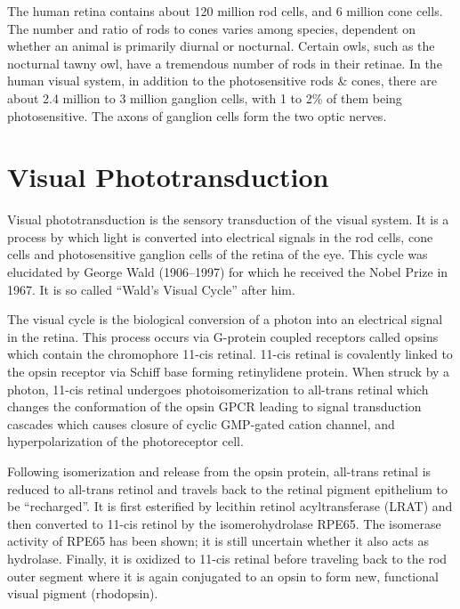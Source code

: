 \documentclass[]{book}
\begin{document}
The human retina contains about 120 million rod cells, and 6 million cone cells. The number and ratio of rods to cones varies among species, dependent on whether an animal is primarily diurnal or nocturnal. Certain owls, such as the nocturnal tawny owl, have a tremendous number of rods in their retinae. In the human visual system, in addition to the photosensitive rods \& cones, there are about 2.4 million to 3 million ganglion cells, with 1 to 2\% of them being photosensitive. The axons of ganglion cells form the two optic nerves.

\hypertarget{visual-phototransduction}{%
\section{Visual Phototransduction}\label{visual-phototransduction}}

Visual phototransduction is the sensory transduction of the visual system. It is a process by which light is converted into electrical signals in the rod cells, cone cells and photosensitive ganglion cells of the retina of the eye. This cycle was elucidated by George Wald (1906--1997) for which he received the Nobel Prize in 1967. It is so called ``Wald's Visual Cycle'' after him.

The visual cycle is the biological conversion of a photon into an electrical signal in the retina. This process occurs via G-protein coupled receptors called opsins which contain the chromophore 11-cis retinal. 11-cis retinal is covalently linked to the opsin receptor via Schiff base forming retinylidene protein. When struck by a photon, 11-cis retinal undergoes photoisomerization to all-trans retinal which changes the conformation of the opsin GPCR leading to signal transduction cascades which causes closure of cyclic GMP-gated cation channel, and hyperpolarization of the photoreceptor cell.

Following isomerization and release from the opsin protein, all-trans retinal is reduced to all-trans retinol and travels back to the retinal pigment epithelium to be ``recharged''. It is first esterified by lecithin retinol acyltransferase (LRAT) and then converted to 11-cis retinol by the isomerohydrolase RPE65. The isomerase activity of RPE65 has been shown; it is still uncertain whether it also acts as hydrolase. Finally, it is oxidized to 11-cis retinal before traveling back to the rod outer segment where it is again conjugated to an opsin to form new, functional visual pigment (rhodopsin).
\end{document}
